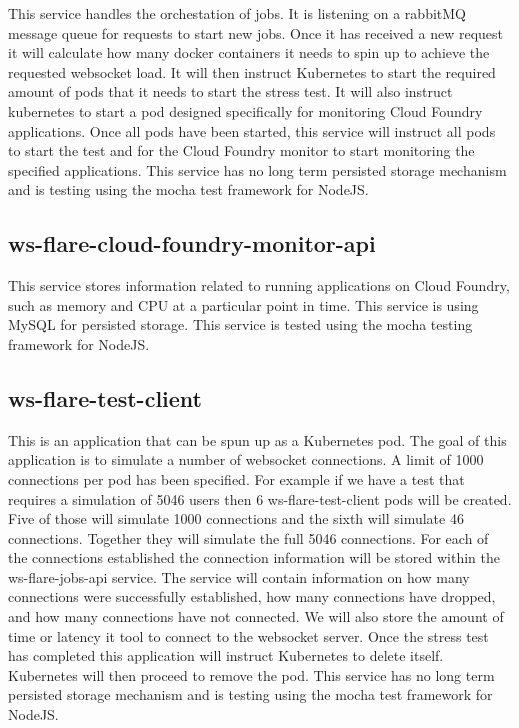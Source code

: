 This service handles the orchestation of jobs. It is listening on a rabbitMQ message queue for requests to start new jobs. Once it has received a new request it will calculate how many docker containers it needs to spin up to achieve the requested websocket load. It will then instruct Kubernetes to start the required amount of pods that it needs to start the stress test. It will also instruct kubernetes to start a pod designed specifically for monitoring Cloud Foundry applications. Once all pods have been started, this service will instruct all pods to start the test and for the Cloud Foundry monitor to start monitoring the specified applications. This service has no long term persisted storage mechanism and is testing using the mocha test framework for NodeJS.

\subsection{ws-flare-cloud-foundry-monitor-api}

This service stores information related to running applications on Cloud Foundry, such as memory and CPU at a particular point in time. This service is using MySQL for persisted storage. This service is tested using the mocha testing framework for NodeJS.

\subsection{ws-flare-test-client}

This is an application that can be spun up as a Kubernetes pod. The goal of this application is to simulate a number of websocket connections. A limit of 1000 connections per pod has been specified. For example if we have a test that requires a simulation of 5046 users then 6 ws-flare-test-client pods will be created. Five of those will simulate 1000 connections and the sixth will simulate 46 connections. Together they will simulate the full 5046 connections. For each of the connections established the connection information will be stored within the ws-flare-jobs-api service. The service will contain information on how many connections were successfully established, how many connections have dropped, and how many connections have not connected. We will also store the amount of time or latency it tool to connect to the websocket server. Once the stress test has completed this application will instruct Kubernetes to delete itself. Kubernetes will then proceed to remove the pod. This service has no long term persisted storage mechanism and is testing using the mocha test framework for NodeJS.

